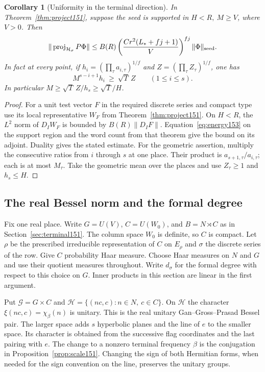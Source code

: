\documentclass[a4paper,11pt]{article}
\newtheorem{corollary}[proposition]{Corollary}
\theoremstyle{definition}
\theoremstyle{remark}
\numberwithin{equation}{section}
\begin{document}
\begin{corollary}[Uniformity in the terminal direction]
\label{cor:ang153}
In Theorem~\ref{thm:project151}, suppose the seed is supported
in \(H<R,\ M\ge V\), where \(V>0\). Then
\[
   \|\operatorname{proj}_{\mathcal H_\sigma}P\Phi\|
      \le B(R)\left(\frac{Cr^2(L_*+fj+1)}{V}\right)^{fj}
                                         \|\Phi\|_{\rm seed}.
\]
In fact at every point, if \(h_i=(\prod_\tau a_{i,\tau})^{1/f}\)
and \(Z=(\prod_\tau Z_\tau)^{1/f}\), one has
\[
            M^{s-i+1}h_i\ \ge\ \sqrt T\, Z\qquad(1\le i\le s).
\]
In particular \(M\ge\sqrt T\, Z/h_s\ge\sqrt T/H\).
\end{corollary}
\begin{proof}
For a unit test vector \(F\) in the required discrete series
and compact type use its local representative \(W_F\) from
Theorem~\ref{thm:project151}. On \(H<R\), the \(L^2\) norm of
\(D_I W_F\) is bounded by \(B(R)\|D_I F\|\).
Equation~\eqref{eq:energy153} on the support region and the
word count from that theorem give the bound on its adjoint.
Duality gives the stated estimate. For the geometric assertion,
multiply the consecutive ratios from \(i\) through \(s\) at
one place. Their product is \(a_{s+1,\tau}/a_{i,\tau}\);
each is at most \(M_\tau\). Take the geometric mean over the
places and use \(Z_\tau\ge1\) and \(h_s\le H\).
\end{proof}

\subsection{The real Bessel norm and the formal degree}\label{nav:VII-07}
\label{sec:relative155}

Fix one real place. Write \(G=U(V)\), \(C=U(W_0)\), and
\(B=N\rtimes C\) as in Section~\ref{sec:terminal151}.
The column space \(W_0\) is definite, so \(C\) is compact.
Let \(\rho\) be the prescribed irreducible representation of
\(C\) on \(E_\rho\) and \(\sigma\) the discrete series of the row.
Give \(C\) probability Haar measure. Choose Haar measures on
\(N\) and \(G\) and use their quotient measures throughout.
Write \(d_\sigma\) for the formal degree with respect to this
choice on \(G\). Inner products in this section are linear in
the first argument.

Put \(\mathcal G=G\times C\) and
\(\mathcal H=\{(nc,c):n\in N,\ c\in C\}\).
On \(\mathcal H\) the character \(\xi(nc,c)=\chi_\beta(n)\)
is unitary. This is the real unitary Gan--Gross--Prasad Bessel
pair. The larger space adds \(s\) hyperbolic planes and the
line of \(e\) to the smaller space. Its character is obtained
from the successive flag coordinates and the last pairing
with \(e\). The change to a nonzero terminal frequency
\(\beta\) is the conjugation in Proposition~\ref{prop:scale151}.
Changing the sign of both Hermitian forms, when needed for the
sign convention on the line, preserves the unitary groups.
\end{document}
